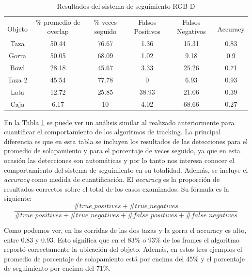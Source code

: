 \begin{table}[h]
    \begin{tabular}{|c|c|c|c|c|c|}
    \hline
    & \multirow{2}{2.4cm}{\% promedio de overlap} & \multirow{2}{2cm}{\% veces seguido} & \multirow{2}{1.6cm}{Falsos Positivos} & \multirow{2}{1.6cm}{Falsos Negativos}\\
	Objeto & & & & & Accuracy\\
	\hline
    Taza    & 50.44      & 76.67     & 1.36           & 15.31    & 0.83 \\
    \hline
    Gorra   & 50.05      & 68.09     & 1.02           &  9.18    & 0.9 \\
    \hline
    Bowl    & 28.18      & 45.67     & 3.33           & 25.26    & 0.71 \\
    \hline
    Taza 2  & 45.54      & 77.78     &    0           &  6.93    & 0.93 \\
    \hline
    Lata    & 12.72      & 25.85     & 38.93          & 21.06    & 0.39 \\
    \hline
    Caja    &  6.17      &    10     &  4.02          & 68.66    & 0.27 \\
    \hline
    \end{tabular}
\caption{Resultados del sistema de seguimiento RGB-D}
\label{tabla_sistema_rgbd}
\end{table}

En la Tabla \ref{tabla_sistema_rgbd} se puede ver un análisis similar al realizado anteriormente para cuantificar el comportamiento de los algoritmos de tracking. La principal diferencia es que en esta tabla se incluyen los resultados de las detecciones para el promedio de solapamiento y para el porcentaje de veces seguido, ya que en esta ocasión las detecciones son automáticas y por lo tanto nos interesa conocer el comportamiento del sistema de seguimiento en su totalidad. Además, se incluye el \textit{accuracy} como medida de cuantificación. El \textit{accuracy} es la proporción de resultados correctos sobre el total de los casos examinados. Su fórmula es la siguiente:
\begin{equation}
\frac{\#true\_positives + \#true\_negatives}{\#true\_positives + \#true\_negatives + \#false\_positives + \#false\_negatives}
\end{equation}

Como podemos ver, en las corridas de las dos tazas y la gorra el accuracy es alto, entre 0.83 y 0.93. Esto significa que en el 83\% o 93\% de los frames el algoritmo reportó correctamente la ubicación del objeto. Además, en estos tres ejemplos el promedio de porcentaje de solapamiento está por encima del 45\% y el porcentaje de seguimiento por encima del 71\%.

